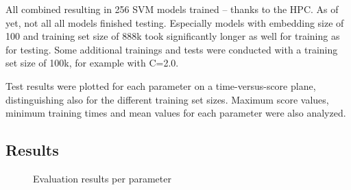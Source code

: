 \documentclass[11pt,a4paper]{article}
\begin{document}
All combined resulting in 256 SVM models trained -- thanks to the HPC. As of yet, not all all models finished testing. Especially models with embedding size of 100 and training set size of 888k took significantly longer as well for training as for testing. Some additional trainings and tests were conducted with a training set size of 100k, for example with C=2.0.

Test results were plotted for each parameter on a time-versus-score plane, distinguishing also for the different training set sizes. Maximum score values, minimum training times and mean values for each parameter were also analyzed.


\subsection{Results}

\begin{figure}[htbp]
	\centering
	\caption{Evaluation results per parameter}
	\label{fig:results1}
\end{figure}
\end{document}
